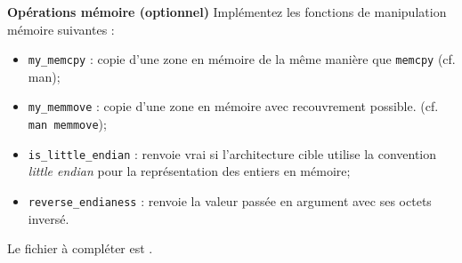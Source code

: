 \documentclass[10pt]{article}\usepackage[enonce]{exemptty}
\begin{document}
\begin{Exercice}\textbf{Opérations mémoire (optionnel)}
Implémentez les fonctions de manipulation mémoire suivantes :
\begin{itemize}
\item \texttt{my\_memcpy} : copie d'une zone en mémoire de la même manière que
  \texttt{memcpy} (cf. man);
\item \texttt{my\_memmove} : copie d'une zone en mémoire avec recouvrement
  possible.  (cf. \texttt{man memmove});
\item \texttt{is\_little\_endian} : renvoie vrai si l'architecture cible
  utilise la convention \textit{little endian} pour la représentation des entiers en
  mémoire;
\item \texttt{reverse\_endianess} : renvoie la valeur passée en argument avec
  ses octets inversé.
\end{itemize}
  Le fichier à compléter est . 
\end{Exercice}
\end{document}
